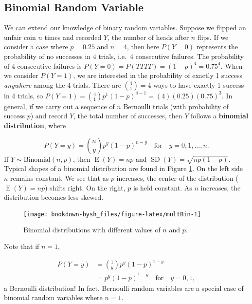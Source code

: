 \documentclass[
]{krantz}
\newcommand{\E}{\operatorname{E}}
\newcommand{\SD}{\operatorname{SD}}
\begin{document}
\hypertarget{sec-binomial}{%
\subsection{Binomial Random Variable}\label{sec-binomial}}

We can extend our knowledge of binary random variables. Suppose we flipped an unfair coin \(n\) times and recorded \(Y\), the number of heads after \(n\) flips. If we consider a case where \(p = 0.25\) and \(n = 4\), then here \(P(Y=0)\) represents the probability of no successes in 4 trials, i.e.~4 consecutive failures. The probability of 4 consecutive failures is \(P(Y = 0) = P(TTTT) = (1-p)^4 = 0.75^4\). When we consider \(P(Y = 1)\), we are interested in the probability of exactly 1 success \emph{anywhere} among the 4 trials. There are \(\binom{4}{1} = 4\) ways to have exactly 1 success in 4 trials, so \(P(Y = 1) = \binom{4}{1}p^1(1-p)^{4-1} = (4)(0.25)(0.75)^3\). In general, if we carry out a sequence of \(n\) Bernoulli trials (with probability of success \(p\)) and record \(Y\), the total number of successes, then \(Y\) follows a \textbf{binomial distribution},  where

\begin{equation}
P(Y=y) = \binom{n}{y} p^y (1-p)^{n-y} \quad \textrm{for} \quad y = 0, 1, \ldots, n.
\label{eq:binomRV}
\end{equation}
If \(Y \sim \textrm{Binomial}(n,p)\), then \(\E(Y) = np\) and \(\SD(Y) = \sqrt{np(1-p)}\).
Typical shapes of a binomial distribution are found in Figure \ref{fig:multBin}. On the left side \(n\) remains constant. We see that as \(p\) increases, the center of the distribution (\(\E(Y) = np\)) shifts right. On the right, \(p\) is held constant. As \(n\) increases, the distribution becomes less skewed.



\begin{figure}

{\centering \texttt{[image: bookdown-bysh\_files/figure-latex/multBin-1]} 

}

\caption{Binomial distributions with different values of \(n\) and \(p\).}\label{fig:multBin}
\end{figure}

Note that if \(n=1\),

\begin{align*}
 P(Y=y) &= \binom{1}{y} p^y(1-p)^{1-y} \\
        &= p^y(1-p)^{1-y}\quad \textrm{for}\quad y = 0, 1,
\end{align*}
a Bernoulli distribution! In fact, Bernoulli random variables are a special case of binomial random variables where \(n=1\).
\end{document}
